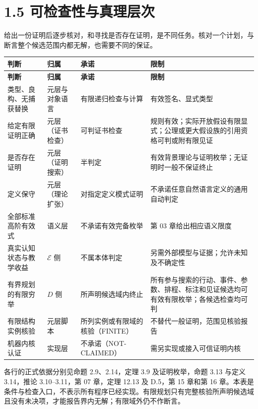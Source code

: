\documentclass[UTF8,a4paper,zihao=-4,fontset=windows,openany]{ctexbook}
\begin{document}
\section{1.5 可检查性与真理层次}
给出一份证明后逐步核对，和寻找是否存在证明，是不同任务。核对一个计划，与断言整个候选范围内都无解，也需要不同的保证。

\begingroup\small\setlength{\tabcolsep}{4pt}
\begin{longtable}{>{\raggedright\arraybackslash}p{}>{\raggedright\arraybackslash}p{}>{\raggedright\arraybackslash}p{}>{\raggedright\arraybackslash}p{}}
\toprule
\textbf{判断} & \textbf{归属} & \textbf{承诺} & \textbf{限制} \\
\midrule
\endfirsthead
\toprule
\textbf{判断} & \textbf{归属} & \textbf{承诺} & \textbf{限制} \\
\midrule
\endhead
\bottomrule
\endfoot
\bottomrule
\endlastfoot
类型、良构、无捕获替换 & 元层与对象语言 & 有限递归检查与计算 & 有效签名、显式类型 \\
给定有限证明正确 & 元层（证书检查） & 可判证书检查 & 规则有效；实际开放假设有限显式；公理或更大假设族的引用资格可判或附有限见证 \\
是否存在证明 & 元层（证明搜索） & 半判定 & 有效背景理论与证明枚举；无证明时一般不保证终止 \\
定义保守 & 元层（理论扩张） & 对指定定义模式证明 & 不承诺任意自然语言定义的通用自动判定 \\
全部标准高阶有效式 & 语义层 & 不承诺有效完备枚举 & 第 03 章给出相应语义限度 \\
真实认知状态与教学收益 & \(\mathcal E\) 侧 & 不属本体判定 & 另需外部模型与证据；允许未知及不确定性 \\
有界规划的有限穷举 & \(D\) 侧 & 所声明候选域内终止 & 所有参与搜索的行动、事件、参数、排程、标注和见证候选均可有效有限枚举；各候选检查均可判 \\
有限结构实例核验 & 元层脚本 & 所列实例或有限域的核验（FINITE） & 不替代一般证明，范围见核验报告 \\
机器内核认证 & 实现层 & 不承诺（NOT-CLAIMED） & 需另实现或接入可信证明内核 \\
\end{longtable}
\endgroup

各行的正式依据分别见命题 2.9、2.14，定理 3.9 及证明枚举，命题 3.13 与定义 3.14，推论 3.10–3.11，第 07 章，定理 12.13 及 D.5，第 15 章和第 16 章。本表是条件与检查入口，不表示所有程序已经实现。有限规划只有完整核验所声明候选域且没有未决项，才能报告界内无解；有限域外仍不作断言。
\end{document}
